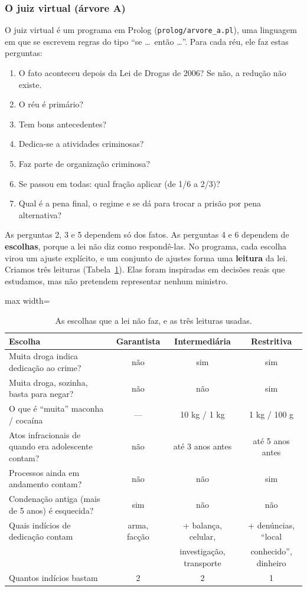 \documentclass[11pt,a4paper]{article}
\begin{document}
\subsubsection*{O juiz virtual (árvore A)}

O juiz virtual é um programa em Prolog (\texttt{prolog/arvore\_a.pl}), uma linguagem em que se
escrevem regras do tipo ``se \ldots\ então \ldots''. Para cada réu, ele faz estas perguntas:
\begin{enumerate}
  \item O fato aconteceu depois da Lei de Drogas de 2006? Se não, a redução não existe.
  \item O réu é primário?
  \item Tem bons antecedentes?
  \item Dedica-se a atividades criminosas?
  \item Faz parte de organização criminosa?
  \item Se passou em todas: qual fração aplicar (de 1/6 a 2/3)?
  \item Qual é a pena final, o regime e se dá para trocar a prisão por pena alternativa?
\end{enumerate}
As perguntas 2, 3 e 5 dependem só dos fatos. As perguntas 4 e 6 dependem de
\textbf{escolhas}, porque a lei não diz como respondê-las. No programa, cada escolha virou
um ajuste explícito, e um conjunto de ajustes forma uma \textbf{leitura} da lei.
Criamos três leituras (Tabela~\ref{tab:perfis}). Elas foram inspiradas em decisões reais
que estudamos, mas não pretendem representar nenhum ministro.

\begin{table}[h]
\centering\small
\caption{As escolhas que a lei não faz, e as três leituras usadas.}
\label{tab:perfis}
\begin{adjustbox}{max width=\textwidth}
\begin{tabular}{lccc}
\toprule
Escolha & Garantista & Intermediária & Restritiva \\
\midrule
Muita droga indica dedicação ao crime? & não & sim & sim \\
Muita droga, sozinha, basta para negar? & não & não & sim \\
O que é ``muita'' maconha / cocaína & --- & 10 kg / 1 kg & 1 kg / 100 g \\
Atos infracionais de quando era adolescente contam? & não & até 3 anos antes & até 5 anos antes \\
Processos ainda em andamento contam? & não & não & sim \\
Condenação antiga (mais de 5 anos) é esquecida? & sim & não & não \\
Quais indícios de dedicação contam & arma, facção & + balança, celular, & + denúncias, ``local \\
 & & investigação, transporte & conhecido'', dinheiro \\
Quantos indícios bastam & 2 & 2 & 1 \\
\bottomrule
\end{tabular}
\end{adjustbox}
\end{table}
\end{document}
